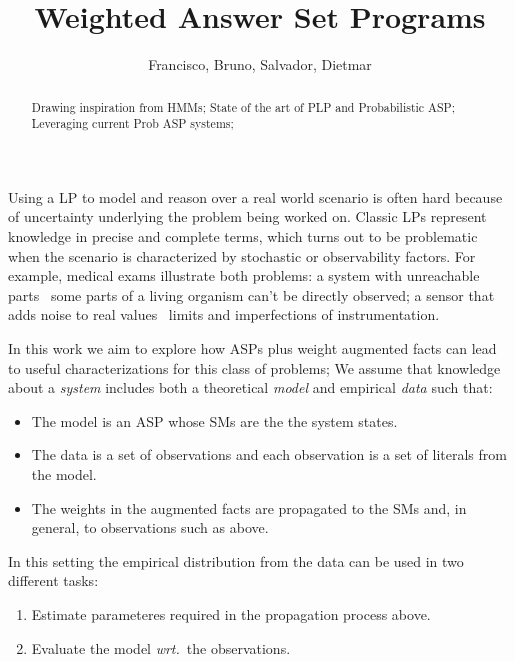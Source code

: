 \documentclass[x11names]{article}
\title{Weighted Answer Set Programs}
\author{Francisco, Bruno, Salvador, Dietmar}
\begin{document}
\maketitle

\begin{abstract}
    Drawing inspiration from HMMs; State of the art of PLP and Probabilistic ASP; Leveraging current Prob ASP systems; 
\end{abstract}


\noindent Using a \acl{LP} to model and reason over a real world scenario is often hard because of uncertainty underlying the problem being worked on.
Classic \aclp{LP} represent knowledge in precise and complete terms, which turns out to be problematic when the scenario is characterized by stochastic or observability factors. For example, medical exams illustrate both problems: a system with unreachable parts \eg\ some parts of a living organism can't be directly observed; a sensor that adds noise to real values \eg\ limits and imperfections of instrumentation.

In this work we aim to explore how \aclp{ASP} plus weight augmented facts can lead to useful characterizations for this class of problems; We assume that knowledge about a \emph{system} includes both a theoretical \emph{model} and empirical \emph{data} such that:
\begin{itemize}\tight
    \item The model is an \acl{ASP} whose \aclp{SM} are the the system states.
    \item The data is a set of observations and each observation is a set of literals from the model.
    \item The weights in the augmented facts are propagated to the \aclp{SM} and, in general, to observations such as above.
\end{itemize} 

In this setting the empirical distribution from the data can be used in two different tasks:
\begin{enumerate}\tight
    \item Estimate parameteres required in the propagation process above.
    \item Evaluate the model \emph{wrt.}\ the observations.
\end{enumerate}
\end{document}
